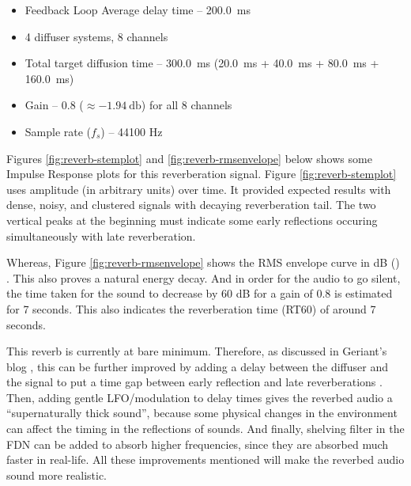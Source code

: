 \begin{itemize}
    \item Feedback Loop Average delay time -- \SI{200.0}{\milli\second}
    \item 4 diffuser systems, 8 channels
    \item Total target diffusion time -- \SI{300.0}{\milli\second} (\SI{20.0}{\milli\second} +
                                            \SI{40.0}{\milli\second} + \SI{80.0}{\milli\second} + 
                                            \SI{160.0}{\milli\second})
    \item Gain -- 0.8 ($\approx \SI{-1.94}{\decibel}$) for all 8 channels
    \item Sample rate ($f_s$) -- 44100 Hz
\end{itemize}

Figures \ref{fig:reverb-stemplot} and \ref{fig:reverb-rmsenvelope} below shows some Impulse Response plots for this reverberation signal. 
Figure \ref{fig:reverb-stemplot} uses amplitude (in arbitrary units) over time. It provided expected results with dense, noisy, and 
clustered signals with decaying reverberation tail. The two vertical peaks at the beginning must indicate some 
early reflections occuring simultaneously with late reverberation. 



Whereas, Figure \ref{fig:reverb-rmsenvelope} shows the RMS envelope curve in dB () \cite{openai_chatgpt}. 
This also proves a natural energy decay. And in order for the audio to go silent, the time taken for the sound to decrease by 60 dB for 
a gain of 0.8 is estimated for 7 seconds. This also indicates the reverberation time (RT60) \cite{valimaki2012fifty} of around 7 seconds.



This reverb is currently at bare minimum. Therefore, as discussed in Geriant's blog \cite{luff2021reverb},  
this can be further improved by adding a delay between the diffuser and the signal to put a time gap
between early reflection and late reverberations \cite{valimaki2012fifty}. Then, adding gentle LFO/modulation to delay
times gives the reverbed audio a ``supernaturally thick sound'', because some physical changes in the environment can
affect the timing in the reflections of sounds. And finally, shelving filter in the FDN can be added to absorb higher
frequencies, since they are absorbed much faster in real-life. All these improvements mentioned will make the reverbed
audio sound more realistic.

